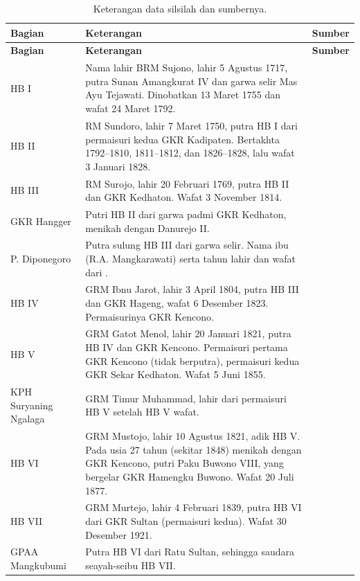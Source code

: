 \documentclass[11pt,a4paper]{article}
\begin{document}
\begin{longtable}{>{\raggedright\arraybackslash}p{3.2cm} >{\raggedright\arraybackslash}p{9.6cm} p{1.8cm}}
\caption{Keterangan data silsilah dan sumbernya.}\label{tab:sumber}\\
\toprule
\textbf{Bagian} & \textbf{Keterangan} & \textbf{Sumber} \\
\midrule
\endfirsthead
\toprule
\textbf{Bagian} & \textbf{Keterangan} & \textbf{Sumber} \\
\midrule
\endhead
HB I & Nama lahir BRM Sujono, lahir 5 Agustus 1717, putra Sunan Amangkurat IV dan garwa selir Mas Ayu Tejawati.
Dinobatkan 13 Maret 1755 dan wafat 24 Maret 1792. & \cite{kj-hb1} \\
HB II & RM Sundoro, lahir 7 Maret 1750, putra HB I dari permaisuri kedua GKR Kadipaten. Bertakhta 1792--1810,
1811--1812, dan 1826--1828, lalu wafat 3 Januari 1828. & \cite{kj-hb2} \\
HB III & RM Surojo, lahir 20 Februari 1769, putra HB II dan GKR Kedhaton. Wafat 3 November 1814. & \cite{kj-hb3} \\
GKR Hangger & Putri HB II dari garwa padmi GKR Kedhaton, menikah dengan Danurejo II. & \cite{kj-pepatih} \\
P. Diponegoro & Putra sulung HB III dari garwa selir. Nama ibu (R.A. Mangkarawati) serta tahun lahir dan wafat dari \cite{wiki-dipo}. & \cite{kj-hb3,wiki-dipo} \\
HB IV & GRM Ibnu Jarot, lahir 3 April 1804, putra HB III dan GKR Hageng, wafat 6 Desember 1823. Permaisurinya GKR Kencono. & \cite{kj-hb4} \\
HB V & GRM Gatot Menol, lahir 20 Januari 1821, putra HB IV dan GKR Kencono. Permaisuri pertama GKR Kencono (tidak berputra),
permaisuri kedua GKR Sekar Kedhaton. Wafat 5 Juni 1855. & \cite{kj-hb5} \\
KPH Suryaning Ngalaga & GRM Timur Muhammad, lahir dari permaisuri HB V setelah HB V wafat. & \cite{kj-hb5,kj-hb6} \\
HB VI & GRM Mustojo, lahir 10 Agustus 1821, adik HB V. Pada usia 27 tahun (sekitar 1848) menikah dengan GKR Kencono,
putri Paku Buwono VIII, yang bergelar GKR Hamengku Buwono. Wafat 20 Juli 1877. & \cite{kj-hb6} \\
HB VII & GRM Murtejo, lahir 4 Februari 1839, putra HB VI dari GKR Sultan (permaisuri kedua). Wafat 30 Desember 1921. & \cite{kj-hb7} \\
GPAA Mangkubumi & Putra HB VI dari Ratu Sultan, sehingga saudara seayah-seibu HB VII. & \cite{ra-y6,wiki-hb8} \\

\end{longtable}
\end{document}
